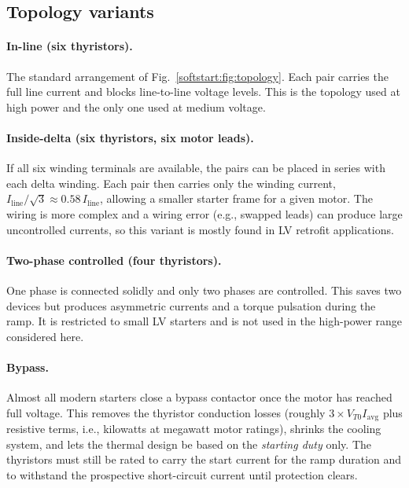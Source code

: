 \subsection{Topology variants}

\paragraph{In-line (six thyristors).} The standard arrangement of
Fig.~\ref{softstart:fig:topology}. Each pair carries the full line current and blocks
line-to-line voltage levels. This is the topology used at high power and the
only one used at medium voltage.

\paragraph{Inside-delta (six thyristors, six motor leads).} If all six
winding terminals are available, the pairs can be placed in series with each
delta winding. Each pair then carries only the winding current,
$I_\mathrm{line}/\sqrt{3} \approx 0.58\,I_\mathrm{line}$, allowing a smaller
starter frame for a given motor. The wiring is more complex and a wiring
error (e.g., swapped leads) can produce large uncontrolled currents, so this
variant is mostly found in LV retrofit applications.

\paragraph{Two-phase controlled (four thyristors).} One phase is connected
solidly and only two phases are controlled. This saves two devices but
produces asymmetric currents and a torque pulsation during the ramp. It is
restricted to small LV starters and is not used in the high-power range
considered here.

\paragraph{Bypass.} Almost all modern starters close a bypass contactor once
the motor has reached full voltage. This removes the thyristor conduction
losses (roughly $3 \times V_{T0} I_\mathrm{avg}$ plus resistive terms, i.e.,
kilowatts at megawatt motor ratings), shrinks the cooling system, and lets
the thermal design be based on the \emph{starting duty} only. The thyristors
must still be rated to carry the start current for the ramp duration and to
withstand the prospective short-circuit current until protection clears.

